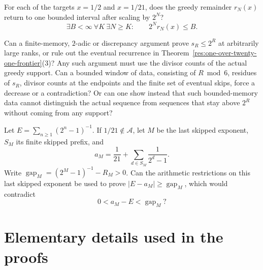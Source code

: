 \documentclass[11pt]{article}
\newcommand{\Ach}{\mathcal A}
\begin{document}
\begin{problem}\label{prob:scaled-return}
For each of the targets $x=1/2$ and $x=1/21$, does the greedy remainder
$r_N(x)$ return to one bounded interval after scaling by $2^N$?
\[
 \exists B<\infty\ \forall K\ \exists N\ge K:
 \qquad 2^N r_N(x)\le B.
\]
\end{problem}

\begin{problem}\label{prob:actual-invariant}
Can a finite-memory, $2$-adic or discrepancy argument prove $s_R\le2^R$
at arbitrarily large ranks, or rule out the eventual recurrence in
Theorem~\ref{res:one-over-twenty-one-frontier}(3)? Any such argument
must use the divisor counts of the actual greedy support. Can a bounded
window of data, consisting of $R\bmod6$, residues of $s_R$, divisor
counts at the endpoints and the finite set of eventual skips, force a
decrease or a contradiction? Or can one show instead that such
bounded-memory data cannot distinguish the actual sequence from
sequences that stay above $2^R$ without coming from any support?
\end{problem}

\begin{problem}\label{prob:fatal-interval}
Let $E=\sum_{n\ge1}(2^n-1)^{-1}$.  If $1/21\notin\Ach$, let $M$ be the last
skipped exponent, $S_M$ its finite skipped prefix, and
\[
 a_M=\frac1{21}+\sum_{d\in S_M}\frac1{2^d-1}.
\]
Write $\operatorname{gap}_M=(2^M-1)^{-1}-R_M>0$. Can the arithmetic
restrictions on this last skipped exponent be used to prove
$|E-a_M|\ge\operatorname{gap}_M$, which would contradict
\[
 0<a_M-E<\operatorname{gap}_M?
\]
\end{problem}


\section{Elementary details used in the proofs}\label{app:elementary-details}
\end{document}
